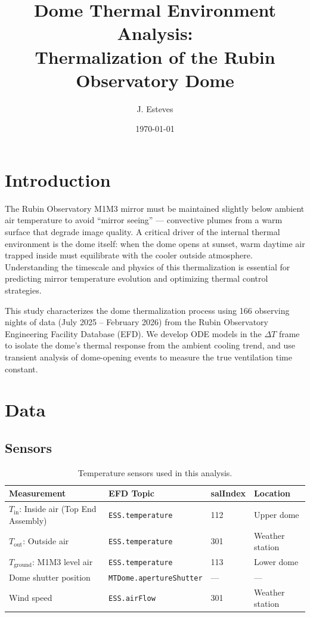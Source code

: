 \documentclass[11pt]{article}
\title{Dome Thermal Environment Analysis:\\Thermalization of the Rubin Observatory Dome}
\author{J. Esteves}
\date{\today}
\begin{document}
\maketitle

\section{Introduction}

The Rubin Observatory M1M3 mirror must be maintained slightly below ambient air temperature to avoid ``mirror seeing'' --- convective plumes from a warm surface that degrade image quality. A critical driver of the internal thermal environment is the dome itself: when the dome opens at sunset, warm daytime air trapped inside must equilibrate with the cooler outside atmosphere. Understanding the timescale and physics of this thermalization is essential for predicting mirror temperature evolution and optimizing thermal control strategies.

This study characterizes the dome thermalization process using 166 observing nights of data (July 2025 -- February 2026) from the Rubin Observatory Engineering Facility Database (EFD). We develop ODE models in the $\Delta T$ frame to isolate the dome's thermal response from the ambient cooling trend, and use transient analysis of dome-opening events to measure the true ventilation time constant.

\section{Data}

\subsection{Sensors}

\begin{table}[H]
\centering
\caption{Temperature sensors used in this analysis.}
\begin{tabular}{llll}
\toprule
Measurement & EFD Topic & salIndex & Location \\
\midrule
$T_\mathrm{in}$: Inside air (Top End Assembly) & \texttt{ESS.temperature} & 112 & Upper dome \\
$T_\mathrm{out}$: Outside air & \texttt{ESS.temperature} & 301 & Weather station \\
$T_\mathrm{ground}$: M1M3 level air & \texttt{ESS.temperature} & 113 & Lower dome \\
Dome shutter position & \texttt{MTDome.apertureShutter} & --- & --- \\
Wind speed & \texttt{ESS.airFlow} & 301 & Weather station \\
\bottomrule
\end{tabular}
\end{table}
\end{document}
